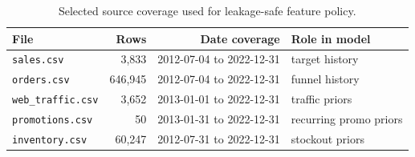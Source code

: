 \begin{table}[h]
\centering
\caption{Selected source coverage used for leakage-safe feature policy.}
\label{tab:source_coverage}
\begin{tabular}{lrrl}
\toprule
File & Rows & Date coverage & Role in model \\
\midrule
\texttt{sales.csv} & 3,833 & 2012-07-04 to 2022-12-31 & target history \\
\texttt{orders.csv} & 646,945 & 2012-07-04 to 2022-12-31 & funnel history \\
\texttt{web\_traffic.csv} & 3,652 & 2013-01-01 to 2022-12-31 & traffic priors \\
\texttt{promotions.csv} & 50 & 2013-01-31 to 2022-12-31 & recurring promo priors \\
\texttt{inventory.csv} & 60,247 & 2012-07-31 to 2022-12-31 & stockout priors \\
\bottomrule
\end{tabular}
\end{table}
